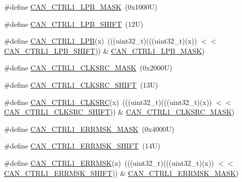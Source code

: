 \begin{DoxyCompactItemize}
\item 
\#define \mbox{\hyperlink{group___c_a_n___register___masks_ga6c3587074ec8b0646ec8c99f659bc90b}{C\+A\+N\+\_\+\+C\+T\+R\+L1\+\_\+\+L\+P\+B\+\_\+\+M\+A\+SK}}~(0x1000\+U)
\item 
\#define \mbox{\hyperlink{group___c_a_n___register___masks_ga61cd46b497234d979cda54fa0952b848}{C\+A\+N\+\_\+\+C\+T\+R\+L1\+\_\+\+L\+P\+B\+\_\+\+S\+H\+I\+FT}}~(12\+U)
\item 
\#define \mbox{\hyperlink{group___c_a_n___register___masks_gae18f765e2797cb4f448e25536a309093}{C\+A\+N\+\_\+\+C\+T\+R\+L1\+\_\+\+L\+PB}}(x)~(((uint32\+\_\+t)(((uint32\+\_\+t)(x)) $<$$<$ \mbox{\hyperlink{group___c_a_n___register___masks_ga61cd46b497234d979cda54fa0952b848}{C\+A\+N\+\_\+\+C\+T\+R\+L1\+\_\+\+L\+P\+B\+\_\+\+S\+H\+I\+FT}})) \& \mbox{\hyperlink{group___c_a_n___register___masks_ga6c3587074ec8b0646ec8c99f659bc90b}{C\+A\+N\+\_\+\+C\+T\+R\+L1\+\_\+\+L\+P\+B\+\_\+\+M\+A\+SK}})
\item 
\#define \mbox{\hyperlink{group___c_a_n___register___masks_ga24eac1a19c79f750c2ed88506155179d}{C\+A\+N\+\_\+\+C\+T\+R\+L1\+\_\+\+C\+L\+K\+S\+R\+C\+\_\+\+M\+A\+SK}}~(0x2000\+U)
\item 
\#define \mbox{\hyperlink{group___c_a_n___register___masks_gaba9b9a37df4f732cbd5b994aafe50eed}{C\+A\+N\+\_\+\+C\+T\+R\+L1\+\_\+\+C\+L\+K\+S\+R\+C\+\_\+\+S\+H\+I\+FT}}~(13\+U)
\item 
\#define \mbox{\hyperlink{group___c_a_n___register___masks_ga2c5077f198d6c382780761923f168407}{C\+A\+N\+\_\+\+C\+T\+R\+L1\+\_\+\+C\+L\+K\+S\+RC}}(x)~(((uint32\+\_\+t)(((uint32\+\_\+t)(x)) $<$$<$ \mbox{\hyperlink{group___c_a_n___register___masks_gaba9b9a37df4f732cbd5b994aafe50eed}{C\+A\+N\+\_\+\+C\+T\+R\+L1\+\_\+\+C\+L\+K\+S\+R\+C\+\_\+\+S\+H\+I\+FT}})) \& \mbox{\hyperlink{group___c_a_n___register___masks_ga24eac1a19c79f750c2ed88506155179d}{C\+A\+N\+\_\+\+C\+T\+R\+L1\+\_\+\+C\+L\+K\+S\+R\+C\+\_\+\+M\+A\+SK}})
\item 
\#define \mbox{\hyperlink{group___c_a_n___register___masks_ga108c8ae37e8122ea29d48b9e68fbcc43}{C\+A\+N\+\_\+\+C\+T\+R\+L1\+\_\+\+E\+R\+R\+M\+S\+K\+\_\+\+M\+A\+SK}}~(0x4000\+U)
\item 
\#define \mbox{\hyperlink{group___c_a_n___register___masks_ga16b53de26664898f76f1cd545181782b}{C\+A\+N\+\_\+\+C\+T\+R\+L1\+\_\+\+E\+R\+R\+M\+S\+K\+\_\+\+S\+H\+I\+FT}}~(14\+U)
\item 
\#define \mbox{\hyperlink{group___c_a_n___register___masks_ga9f5bd9ca13909f4fdc536093afd818ab}{C\+A\+N\+\_\+\+C\+T\+R\+L1\+\_\+\+E\+R\+R\+M\+SK}}(x)~(((uint32\+\_\+t)(((uint32\+\_\+t)(x)) $<$$<$ \mbox{\hyperlink{group___c_a_n___register___masks_ga16b53de26664898f76f1cd545181782b}{C\+A\+N\+\_\+\+C\+T\+R\+L1\+\_\+\+E\+R\+R\+M\+S\+K\+\_\+\+S\+H\+I\+FT}})) \& \mbox{\hyperlink{group___c_a_n___register___masks_ga108c8ae37e8122ea29d48b9e68fbcc43}{C\+A\+N\+\_\+\+C\+T\+R\+L1\+\_\+\+E\+R\+R\+M\+S\+K\+\_\+\+M\+A\+SK}})
$$
\end{DoxyCompactItemize}
